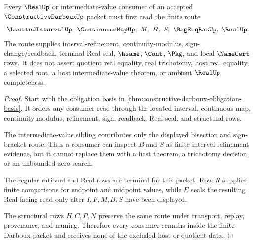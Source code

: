 \begin{theorem}
\label{thm:constructive-darboux-scope}
Every $\RealUp$ or intermediate-value consumer of an accepted $\ConstructiveDarbouxUp$ packet must first read the finite route
$$
\LocatedIntervalUp,\ \ContinuousMapUp,\ M,\ B,\ S,\ \RegSeqRatUp,\ \RealUp .
$$
The route supplies interval-refinement, continuity-modulus, sign-change/readback, terminal Real seal, $\hsame$, $\Cont$, $\Pkg$, and local $\NameCert$ rows. It does not assert quotient real equality, real trichotomy, host real equality, a selected root, a host intermediate-value theorem, or ambient $\RealUp$ completeness.
\end{theorem}
\begin{proof}
Start with the obligation basis in \autoref{thm:constructive-darboux-obligation-basis}. It orders any consumer read through the located interval, continuous-map, continuity-modulus, refinement, sign, readback, Real seal, and structural rows.

The intermediate-value sibling contributes only the displayed bisection and sign-bracket route. Thus a consumer can inspect $B$ and $S$ as finite interval-refinement evidence, but it cannot replace them with a host theorem, a trichotomy decision, or an unbounded zero search.

The regular-rational and Real rows are terminal for this packet. Row $R$ supplies finite comparisons for endpoint and midpoint values, while $E$ seals the resulting Real-facing read only after $I,F,M,B,S$ have been displayed.

The structural rows $H,C,P,N$ preserve the same route under transport, replay, provenance, and naming. Therefore every consumer remains inside the finite Darboux packet and receives none of the excluded host or quotient data.
\end{proof}



